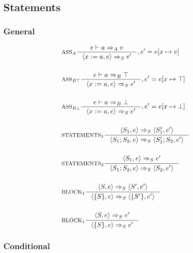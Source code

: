 \subsection{Statements}
\newcommand{\Tlet}{\text{let}}
\subsubsection{General}
\begin{align*}
&\inference[$\text{ASS}_A$]{e \vdash a \Rightarrow_A v}
                         {\Braket{x := a,e} \Rightarrow_S e'}
												{, e' = e[x \mapsto v]}
\\\\
&\inference[$\text{ASS}_{B\top}$]{e \vdash a \Rightarrow_B \top}
                         {\Braket{x := a,e} \Rightarrow_S e'}
												{, e' = e[x \mapsto \top]}
\\\\
&\inference[$\text{ASS}_{B\bot}$]{e \vdash a \Rightarrow_B \bot}
                         {\Braket{x := a,e} \Rightarrow_S e'}
												{, e' = e[x \mapsto \bot]}
\\\\
&\inference[$\text{STATEMENTS}_1$]{\Braket{S_1,e} \Rightarrow_S \Braket{S_1',e'}}
                         {\Braket{S_1;S_2,e} \Rightarrow_S \Braket{S_1';S_2,e'}}
\\\\
&\inference[$\text{STATEMENTS}_2$]{\Braket{S_1,e} \Rightarrow_S e'}
                         {\Braket{S_1;S_2,e} \Rightarrow_S \Braket{S_2,e'}}
\\\\
&\inference[$\text{BLOCK}_1$]{\Braket{S,e} \Rightarrow_S \Braket{S',e'}}
                         {\Braket{\{S\},e} \Rightarrow_S \Braket{\{S'\},e'}}
\\\\
&\inference[$\text{BLOCK}_1$]{\Braket{S,e} \Rightarrow_S e'}
                         {\Braket{\{S\},e} \Rightarrow_S e'}
\end{align*}

\subsubsection{Conditional}
\newcommand{\Tif}{\text{if}}
\newcommand{\Telse}{\text{else}}

